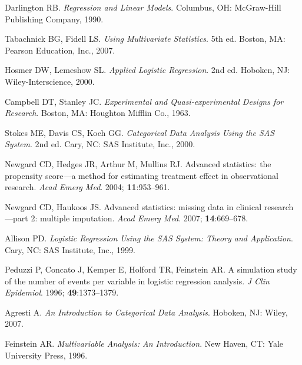 \documentclass[12pt]{article}
\begin{document}


\newpage

\begin{thebibliography}{99}

Darlington RB. \textit{Regression and Linear Models}. Columbus, OH: McGraw-Hill Publishing Company, 1990.

Tabachnick BG, Fidell LS. \textit{Using Multivariate Statistics}. 5th ed. Boston, MA: Pearson Education, Inc., 2007.

Hosmer DW, Lemeshow SL. \textit{Applied Logistic Regression}. 2nd ed. Hoboken, NJ: Wiley-Interscience, 2000.

Campbell DT, Stanley JC. \textit{Experimental and Quasi-experimental Designs for Research}. Boston, MA: Houghton Mifflin Co., 1963.

Stokes ME, Davis CS, Koch GG. \textit{Categorical Data Analysis Using the SAS System}. 2nd ed. Cary, NC: SAS Institute, Inc., 2000.

Newgard CD, Hedges JR, Arthur M, Mullins RJ. Advanced statistics: the propensity score—a method for estimating treatment effect in observational research. \textit{Acad Emerg Med}. 2004; \textbf{11}:953–961.

Newgard CD, Haukoos JS. Advanced statistics: missing data in clinical research—part 2: multiple imputation. \textit{Acad Emerg Med}. 2007; \textbf{14}:669–678.

Allison PD. \textit{Logistic Regression Using the SAS System: Theory and Application}. Cary, NC: SAS Institute, Inc., 1999.

Peduzzi P, Concato J, Kemper E, Holford TR, Feinstein AR. A simulation study of the number of events per variable in logistic regression analysis. \textit{J Clin Epidemiol}. 1996; \textbf{49}:1373–1379.

Agresti A. \textit{An Introduction to Categorical Data Analysis}. Hoboken, NJ: Wiley, 2007.

Feinstein AR. \textit{Multivariable Analysis: An Introduction}. New Haven, CT: Yale University Press, 1996.


\end{thebibliography}
\end{document}
